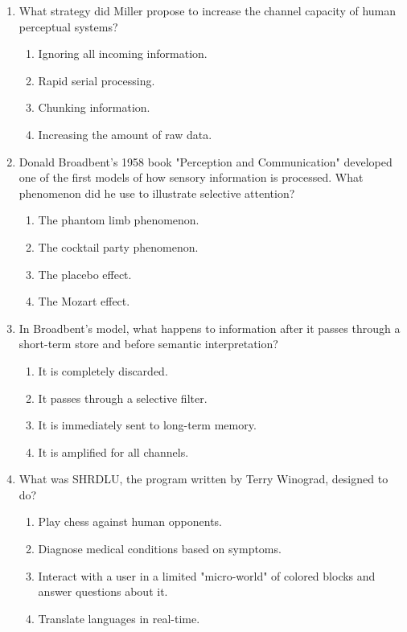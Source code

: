 \documentclass{article}
\begin{document}
\begin{enumerate}[label=\arabic*.]
\item What strategy did Miller propose to increase the channel capacity of human perceptual systems?
\begin{enumerate}[label=(\alph*)]
    \item Ignoring all incoming information.
    \item Rapid serial processing.
    \item Chunking information.
    \item Increasing the amount of raw data.
\end{enumerate}

\item Donald Broadbent's 1958 book "Perception and Communication" developed one of the first models of how sensory information is processed. What phenomenon did he use to illustrate selective attention?
\begin{enumerate}[label=(\alph*)]
    \item The phantom limb phenomenon.
    \item The cocktail party phenomenon.
    \item The placebo effect.
    \item The Mozart effect.
\end{enumerate}

\item In Broadbent's model, what happens to information after it passes through a short-term store and before semantic interpretation?
\begin{enumerate}[label=(\alph*)]
    \item It is completely discarded.
    \item It passes through a selective filter.
    \item It is immediately sent to long-term memory.
    \item It is amplified for all channels.
\end{enumerate}

\item What was SHRDLU, the program written by Terry Winograd, designed to do?
\begin{enumerate}[label=(\alph*)]
    \item Play chess against human opponents.
    \item Diagnose medical conditions based on symptoms.
    \item Interact with a user in a limited "micro-world" of colored blocks and answer questions about it.
    \item Translate languages in real-time.
\end{enumerate}


\end{enumerate}
\end{document}
